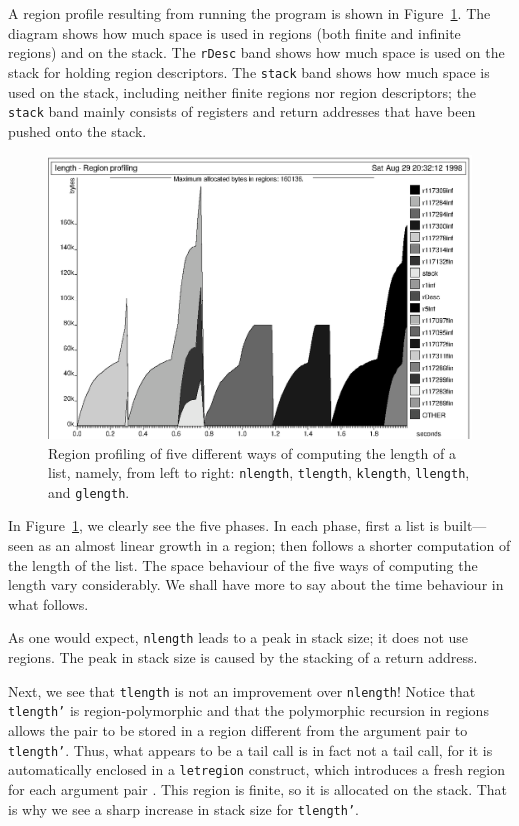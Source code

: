 \documentclass[12pt]{book}
\begin{document}
A region profile resulting from running the program
is shown in Figure~\ref{length.region.fig}.
The diagram shows how much space is used in
regions (both finite and infinite regions) and on the stack. 
The 
%
{\tt rDesc} band shows how much space is used on the stack for
holding region descriptors. The 
%
{\tt stack} band shows how much space is used on the stack, 
including neither finite regions nor region descriptors; the {\tt stack}
band mainly consists of registers and return addresses 
that have been pushed onto the stack. 
\begin{figure}
\begin{center}
\includegraphics{length.region.ps}
\end{center}
\caption{Region profiling of five different
ways of computing the length of a list, namely, from left to right:
{\tt nlength}, {\tt tlength}, {\tt klength}, {\tt llength},
and {\tt glength}.}
\label{length.region.fig}
\end{figure}

In Figure~\ref{length.region.fig}, we clearly see the five phases.  In
each phase, first a list is built---seen as an almost linear growth in
a region; then follows a shorter computation of the length of the
list.  The space behaviour of the five ways of computing the length
vary considerably. We shall have more to say about the time behaviour
in what follows.

As one would expect, {\tt nlength} leads to a peak in stack size; it
does not use regions. The peak in stack size is caused by the stacking
of a return address.

Next, we see that {\tt tlength} is not an improvement over
{\tt nlength}! Notice that {\tt tlength'} is region-polymorphic and that the
polymorphic recursion in regions allows the pair 
to be stored in a region different from  the argument pair to {\tt tlength'}.
Thus, what appears to be a tail call is in fact not a tail call, for
it is automatically enclosed in a {\tt letregion} construct, which introduces
a fresh region for each argument pair . This region is finite, so it is
allocated on the stack. That is why we see a sharp increase in
stack size for {\tt tlength'}.
\end{document}
